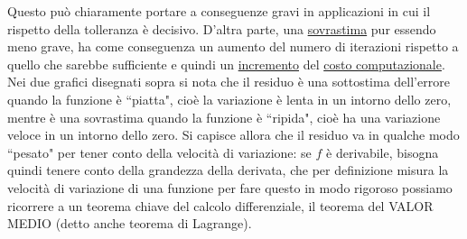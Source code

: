 \documentclass[12pt]{article}
\begin{document}
Questo può chiaramente portare a conseguenze gravi in applicazioni in cui il rispetto della tolleranza è decisivo.
D'altra parte, una \uline{sovrastima} pur essendo meno grave, ha come conseguenza un aumento del numero di iterazioni rispetto a quello che sarebbe sufficiente e quindi un \uline{incremento} del \uline{costo computazionale}.\\
Nei due grafici disegnati sopra si nota che il residuo è una sottostima dell'errore quando la funzione è ``piatta", cioè la variazione è lenta in un intorno dello zero, mentre è una sovrastima quando la funzione è ``ripida", cioè ha una variazione veloce in un intorno dello zero.
Si capisce allora che il residuo va in qualche modo ``pesato" per tener conto della velocità di variazione: se $f$ è derivabile, bisogna quindi tenere conto della grandezza della derivata, che per definizione misura la velocità di variazione di una funzione per fare questo in modo rigoroso possiamo ricorrere a un teorema chiave del calcolo differenziale, il teorema del VALOR MEDIO (detto anche teorema di Lagrange).
\end{document}
